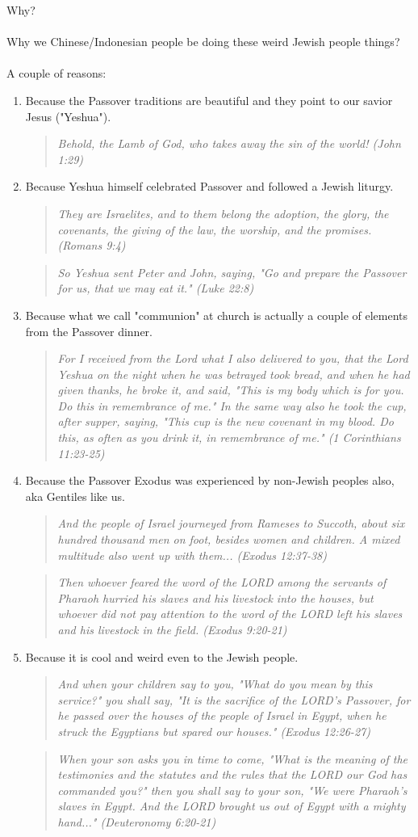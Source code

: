 \documentclass[10pt,oneside,footinclude=true,headinclude=true]{scrbook} %
\newcommand\quot[1]{
	\begin{quote}\textit{\small#1}\end{quote}
}
\begin{document}
Why?\\
\\
Why we Chinese/Indonesian people be doing these weird Jewish people things?\\
\\
A couple of reasons:
\begin{enumerate}
	\item{
		Because the Passover traditions are beautiful and they point to our savior Jesus ("Yeshua").
		\quot{Behold, the Lamb of God, who takes away the sin of the world! (John 1:29)}
	}
	\item{
		Because Yeshua himself celebrated Passover and followed a Jewish liturgy.
		\quot{They are Israelites, and to them belong the adoption, the glory, the covenants, the giving of the law, the worship, and the promises. (Romans 9:4)}
		\quot{So Yeshua sent Peter and John, saying, "Go and prepare the Passover for us, that we may eat it." (Luke 22:8)}
	}
	\item{
		Because what we call "communion" at church is actually a couple of elements from the Passover dinner.
		\quot{For I received from the Lord what I also delivered to you, that the Lord Yeshua on the night when he was betrayed took bread, and when he had given thanks, he broke it, and said, "This is my body which is for you. Do this in remembrance of me." In the same way also he took the cup, after supper, saying, "This cup is the new covenant in my blood. Do this, as often as you drink it, in remembrance of me." (1 Corinthians 11:23-25)}
	}
	\item{
		Because the Passover Exodus was experienced by non-Jewish peoples also, aka Gentiles like us.
		\quot{And the people of Israel journeyed from Rameses to Succoth, about six hundred thousand men on foot, besides women and children. A mixed multitude also went up with them... (Exodus 12:37-38)}
	}
		\quot{Then whoever feared the word of the LORD among the servants of Pharaoh hurried his slaves and his livestock into the houses, but whoever did not pay attention to the word of the LORD left his slaves and his livestock in the field. (Exodus 9:20-21)}
	\item{
		Because it is cool and weird even to the Jewish people.
		\quot{And when your children say to you, "What do you mean by this service?" you shall say, "It is the sacrifice of the LORD's Passover, for he passed over the houses of the people of Israel in Egypt, when he struck the Egyptians but spared our houses." (Exodus 12:26-27)}
		\quot{When your son asks you in time to come, "What is the meaning of the testimonies and the statutes and the rules that the LORD our God has commanded you?" then you shall say to your son, "We were Pharaoh's slaves in Egypt. And the LORD brought us out of Egypt with a mighty hand..." (Deuteronomy 6:20-21)}
}
\end{enumerate}
\end{document}
